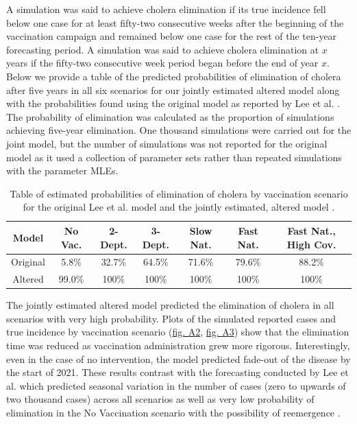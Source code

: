 \documentclass[12pt]{article}
\begin{document}
  A simulation was said to achieve cholera elimination if its true incidence fell below one case for at least fifty-two consecutive weeks after the beginning of the vaccination campaign and remained below one case for the rest of the ten-year forecasting period. A simulation was said to achieve cholera elimination at $x$ years if the fifty-two consecutive week period began before the end of year $x$. Below we provide a table of the predicted probabilities of elimination of cholera after five years in all six scenarios for our jointly estimated altered model along with the probabilities found using the original model as reported by Lee et al. \cite{Lee_supp}. The probability of elimination was calculated as the proportion of simulations achieving five-year elimination. One thousand simulations were carried out for the joint model, but the number of simulations was not reported for the original model as it used a collection of parameter sets rather than repeated simulations with the parameter MLEs.
        \begin{table}[H]
        \caption{Table of estimated probabilities of elimination of cholera by vaccination scenario for the original Lee et al. model and the jointly estimated, altered model \cite{Lee_supp}.}
        \begin{center}
        \begin{tabular}{||c | c c c c c c ||}
         \hline
         Model & No Vac. & 2-Dept. & 3-Dept. & Slow Nat. & Fast Nat. & Fast Nat., High Cov. \\ [0.5ex]
         \hline\hline
         Original & 5.8\% & 32.7\% & 64.5\% & 71.6\% & 79.6\% & 88.2\% \\
         \hline
         Altered & 99.0\% & 100\% & 100\% & 100\% & 100\% & 100\% \\
         \hline
        \end{tabular}
        \end{center}
        \end{table}
        
  The jointly estimated altered model predicted the elimination of cholera in all scenarios with very high probability. Plots of the simulated reported cases and true incidence by vaccination scenario (\hyperref[fig:A2]{fig. A2}, \hyperref[fig. A3]{fig. A3}) show that the elimination time was reduced as vaccination administration grew more rigorous. Interestingly, even in the case of no intervention, the model predicted fade-out of the disease by the start of 2021. These results contrast with the forecasting conducted by Lee et al. which predicted seasonal variation in the number of cases (zero to upwards of two thousand cases) across all scenarios as well as very low probability of elimination in the No Vaccination scenario with the possibility of reemergence \cite{Lee_supp}.
\end{document}
